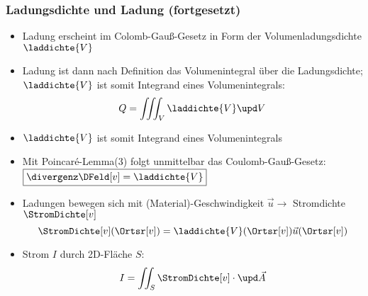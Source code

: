 \begin{frame}
  \frametitle{Ladungsdichte und Ladung (fortgesetzt)}
\begin{itemize}[<+->]
\item<1-> Ladung erscheint im Colomb-Gauß-Gesetz in Form der Volumenladungsdichte \(\laddichte{V} \)
\item<1-> Ladung ist dann nach Definition das Volumenintegral über die Ladungsdichte; \(\laddichte{V} \) ist somit Integrand eines Volumenintegrals:
  \begin{equation*}
    Q = \iiint_V \laddichte{V} \upd V
  \end{equation*}
\item \(\laddichte{V} \) ist somit Integrand eines Volumenintegrals
  \item Mit Poincaré-Lemma(3) folgt unmittelbar das Coulomb-Gauß-Gesetz: \( \boxed{\divergenz\DFeld[v] = \laddichte{V} }\)
  \item Ladungen bewegen sich mit (Material)-Geschwindigkeit \(\vec{u} \to\) Stromdichte \(\StromDichte[v]\)
    \begin{equation*}
\StromDichte[v](\Ortsr[v]) = \laddichte{V}(\Ortsr[v])\vec{u}(\Ortsr[v])
\end{equation*}
\item Strom \(I\) durch 2D-Fläche \(S\):
  \begin{equation*}
    I = \iint_S \StromDichte[v] \cdot \upd\vec{A}
    \end{equation*}
\end{itemize}
\end{frame}


